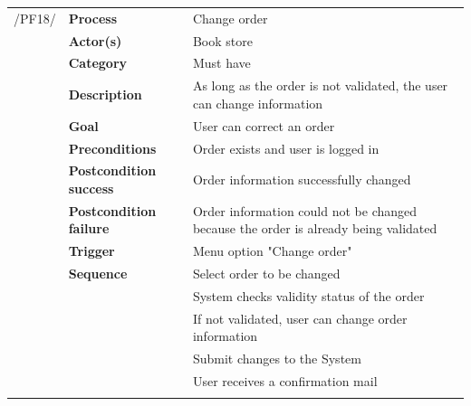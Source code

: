 \documentclass[11pt,a4paper,oneside,svgnames]{report}
\begin{document}
\noindent
\begin{tabular}{p{1.5cm}p{3cm}p{8cm}}
\cellcolor{white}/PF18/	& \textbf{Process} & Change order\\
\cellcolor{white}		& \textbf{Actor(s)} & Book store\\
\cellcolor{white}		& \textbf{Category} & Must have\\
\cellcolor{white}		& \textbf{Description}	 & As long as the order is not validated, the user can change information\\
\cellcolor{white}		& \textbf{Goal} & User can correct an order\\
\cellcolor{white}		& \textbf{Preconditions} & Order exists and user is logged in\\
\cellcolor{white}		& \textbf{Postcondition success} & Order information successfully changed\\
\cellcolor{white}		& \textbf{Postcondition failure} & Order information could not be changed because the order is already being validated\\
\cellcolor{white}		& \textbf{Trigger} & Menu option "Change order"\\
\cellcolor{white}		& \textbf{Sequence} & Select order to be changed\\
\cellcolor{white}		& & System checks validity status of the order\\
\cellcolor{white}		& & If not validated, user can change order information\\
\cellcolor{white}		& & Submit changes to the System\\
\cellcolor{white}		& & User receives a confirmation mail\\
\cellcolor{white}\hfill \\
\end{tabular}
\end{document}
